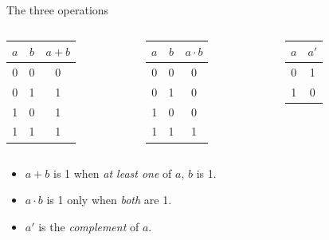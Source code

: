 \documentclass[10pt]{wosm-slides}
\begin{document}
\begin{frame}{The three operations}
  \begin{columns}[T, totalwidth=\textwidth]
      \centering
      \begin{tabular}{@{}cc|c@{}}
        $a$ & $b$ & $a + b$ \\
        \midrule
        0 & 0 & 0 \\
        0 & 1 & 1 \\
        1 & 0 & 1 \\
        1 & 1 & 1 \\
      \end{tabular}\par\medskip
      \centering
      \begin{tabular}{@{}cc|c@{}}
        $a$ & $b$ & $a \cdot b$ \\
        \midrule
        0 & 0 & 0 \\
        0 & 1 & 0 \\
        1 & 0 & 0 \\
        1 & 1 & 1 \\
      \end{tabular}\par\medskip
      \centering
      \begin{tabular}{@{}c|c@{}}
        $a$ & $a'$ \\
        \midrule
        0 & 1 \\
        1 & 0 \\
      \end{tabular}\par\medskip
  \end{columns}

  \bigskip
  \begin{itemize}
    \item $a + b$ is 1 when \emph{at least one} of $a$, $b$ is 1.
    \item $a \cdot b$ is 1 only when \emph{both} are 1.
    \item $a'$ is the \emph{complement} of $a$.
  \end{itemize}
\end{frame}
\end{document}
